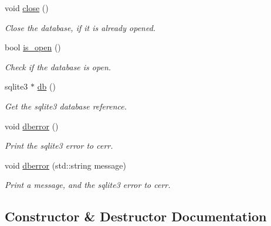 \begin{DoxyCompactItemize}
\mbox{\label{class_database_manager_a36c8ab027e11aba2464f384b18e814e5}} 
void \hyperlink{class_database_manager_a36c8ab027e11aba2464f384b18e814e5}{close} ()
\begin{DoxyCompactList}\small\item\em Close the database, if it is already opened. \end{DoxyCompactList}\item 
bool \hyperlink{class_database_manager_aa5d35a29bdad47e640622ac6e92efd82}{is\+\_\+open} ()
\begin{DoxyCompactList}\small\item\em Check if the database is open. \end{DoxyCompactList}\item 
sqlite3 $\ast$ \hyperlink{class_database_manager_a596c53099fb11d1cdddcc493c2ccb314}{db} ()
\begin{DoxyCompactList}\small\item\em Get the sqlite3 database reference. \end{DoxyCompactList}\item 
\mbox{\label{class_database_manager_a8f991e99913d1fd0f0f4e75fb7261f1d}} 
void \hyperlink{class_database_manager_a8f991e99913d1fd0f0f4e75fb7261f1d}{dberror} ()
\begin{DoxyCompactList}\small\item\em Print the sqlite3 error to cerr. \end{DoxyCompactList}\item 
void \hyperlink{class_database_manager_a6fc3fa295292d8c873abb4a2f4e73e5b}{dberror} (std\+::string message)
\begin{DoxyCompactList}\small\item\em Print a message, and the sqlite3 error to cerr. \end{DoxyCompactList}\end{DoxyCompactItemize}


\subsection{Constructor \& Destructor Documentation}
\mbox{\label{class_database_manager_afc98bb0ecd0a4acd6094bc2de4a3c0f9}} 

